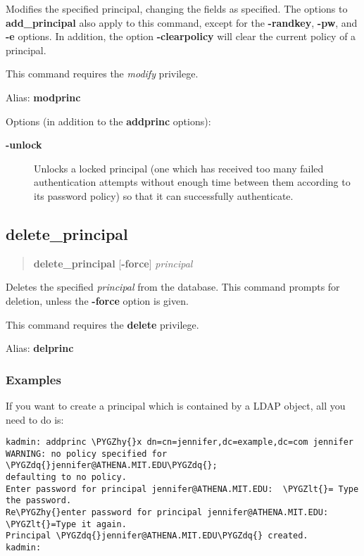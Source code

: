 \documentclass[letterpaper,10pt,english]{sphinxmanual}
\def\PYGZlt{\char`\<}
\def\PYGZhy{\char`\-}
\def\PYGZdq{\char`\"}
\begin{document}
Modifies the specified principal, changing the fields as specified.
The options to \textbf{add\_principal} also apply to this command, except
for the \textbf{-randkey}, \textbf{-pw}, and \textbf{-e} options.  In addition, the
option \textbf{-clearpolicy} will clear the current policy of a principal.

This command requires the \emph{modify} privilege.

Alias: \textbf{modprinc}

Options (in addition to the \textbf{addprinc} options):
\begin{description}
\item[{\textbf{-unlock}}] \leavevmode
Unlocks a locked principal (one which has received too many failed
authentication attempts without enough time between them according
to its password policy) so that it can successfully authenticate.

\end{description}


\subsection{delete\_principal}
\label{admin/database:delete-principal}\begin{quote}

\textbf{delete\_principal} {[}\textbf{-force}{]} \emph{principal}
\end{quote}

Deletes the specified \emph{principal} from the database.  This command
prompts for deletion, unless the \textbf{-force} option is given.

This command requires the \textbf{delete} privilege.

Alias: \textbf{delprinc}


\subsubsection{Examples}
\label{admin/database:examples}
If you want to create a principal which is contained by a LDAP object,
all you need to do is:

\begin{Verbatim}[commandchars=\\\{\}]
kadmin: addprinc \PYGZhy{}x dn=cn=jennifer,dc=example,dc=com jennifer
WARNING: no policy specified for \PYGZdq{}jennifer@ATHENA.MIT.EDU\PYGZdq{};
defaulting to no policy.
Enter password for principal jennifer@ATHENA.MIT.EDU:  \PYGZlt{}= Type the password.
Re\PYGZhy{}enter password for principal jennifer@ATHENA.MIT.EDU:  \PYGZlt{}=Type it again.
Principal \PYGZdq{}jennifer@ATHENA.MIT.EDU\PYGZdq{} created.
kadmin:
\end{Verbatim}
\end{document}
